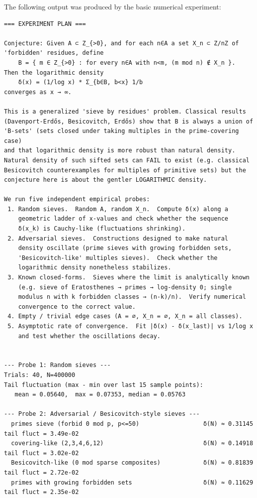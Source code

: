 \documentclass[11pt]{article}
\begin{document}
The following output was produced by the basic numerical experiment:

\begin{lstlisting}
=== EXPERIMENT PLAN ===

Conjecture: Given A ⊂ Z_{>0}, and for each n∈A a set X_n ⊂ Z/nZ of
'forbidden' residues, define
    B = { m ∈ Z_{>0} : for every n∈A with n<m, (m mod n) ∉ X_n }.
Then the logarithmic density
    δ(x) = (1/log x) * Σ_{b∈B, b<x} 1/b
converges as x → ∞.

This is a generalized 'sieve by residues' problem. Classical results
(Davenport-Erdős, Besicovitch, Erdős) show that B is always a union of
'B-sets' (sets closed under taking multiples in the prime-covering case)
and that logarithmic density is more robust than natural density.
Natural density of such sifted sets can FAIL to exist (e.g. classical
Besicovitch counterexamples for multiples of primitive sets) but the
conjecture here is about the gentler LOGARITHMIC density.

We run five independent empirical probes:
 1. Random sieves.  Random A, random X_n.  Compute δ(x) along a
    geometric ladder of x-values and check whether the sequence
    δ(x_k) is Cauchy-like (fluctuations shrinking).
 2. Adversarial sieves.  Constructions designed to make natural
    density oscillate (prime sieves with growing forbidden sets,
    'Besicovitch-like' multiples sieves).  Check whether the
    logarithmic density nonetheless stabilizes.
 3. Known closed-forms.  Sieves where the limit is analytically known
    (e.g. sieve of Eratosthenes → primes → log-density 0; single
    modulus n with k forbidden classes → (n-k)/n).  Verify numerical
    convergence to the correct value.
 4. Empty / trivial edge cases (A = ∅, X_n = ∅, X_n = all classes).
 5. Asymptotic rate of convergence.  Fit |δ(x) - δ(x_last)| vs 1/log x
    and test whether the oscillations decay.


--- Probe 1: Random sieves ---
Trials: 40, N=400000
Tail fluctuation (max - min over last 15 sample points):
   mean = 0.05640,  max = 0.07353, median = 0.05763

--- Probe 2: Adversarial / Besicovitch-style sieves ---
  primes sieve (forbid 0 mod p, p<=50)                  δ(N) ≈ 0.31145   tail fluct = 3.49e-02
  covering-like (2,3,4,6,12)                            δ(N) ≈ 0.14918   tail fluct = 3.02e-02
  Besicovitch-like (0 mod sparse composites)            δ(N) ≈ 0.81839   tail fluct = 2.72e-02
  primes with growing forbidden sets                    δ(N) ≈ 0.11629   tail fluct = 2.35e-02


\end{lstlisting}
\end{document}
